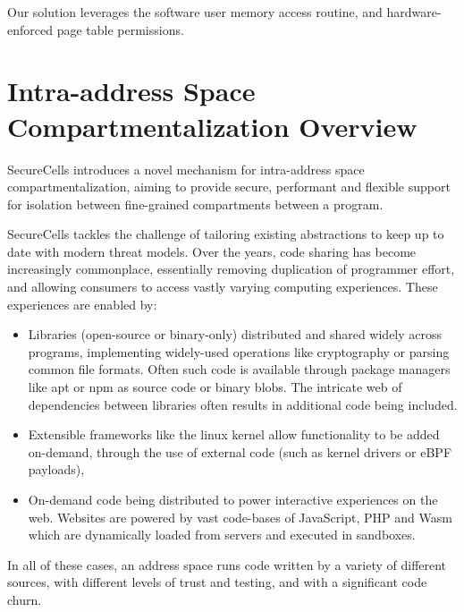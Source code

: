 Our solution leverages the software user memory access routine, and
hardware-enforced page table permissions.

\section{Intra-address Space Compartmentalization Overview}

SecureCells introduces a novel mechanism for intra-address space compartmentalization,
aiming to provide secure, performant and flexible support for isolation between
fine-grained compartments between a program. 

SecureCells tackles the challenge of tailoring existing abstractions to keep up to date
with modern threat models.
Over the years, code sharing has become increasingly commonplace, essentially
removing duplication of programmer effort, and allowing consumers to access
vastly varying computing experiences.
These experiences are enabled by:
\begin{itemize}
  \item Libraries (open-source or binary-only) distributed and shared widely across
        programs, implementing widely-used operations like cryptography or
        parsing common file formats. Often such code is available through package 
        managers like apt or npm as source code or binary blobs. 
        The intricate web of dependencies between libraries often results in
        additional code being included.
  \item Extensible frameworks like the linux kernel allow functionality to be added
        on-demand, through the use of external code (such as kernel drivers or eBPF
        payloads),
  \item On-demand code being distributed to power interactive experiences on the web.
        Websites are powered by vast code-bases of JavaScript, PHP and Wasm which are
        dynamically loaded from servers and executed in sandboxes.
\end{itemize}
In all of these cases, an address space runs code written by a variety of different
sources, with different levels of trust and testing, and with a significant code 
churn.

